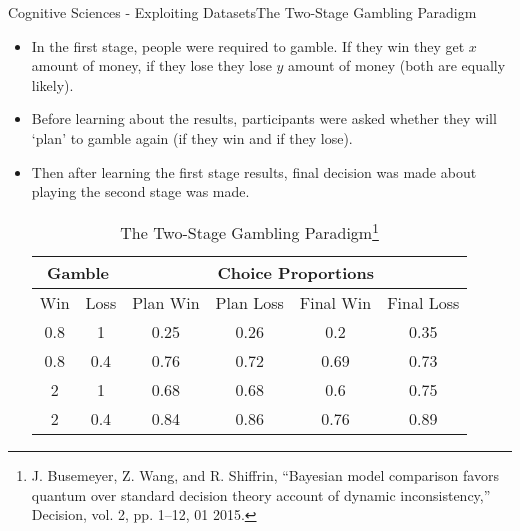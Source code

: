 \documentclass[aspectratio=169, handout]{beamer}
\theoremstyle{example}
\begin{document}
\begin{frame}{Cognitive Sciences - Exploiting Datasets}{The Two-Stage Gambling Paradigm}
  \begin{itemize}
  \pause\item {
    In the first stage, people were required to gamble. If they win they get $x$ amount of money, if they lose they lose $y$ amount of money (both are equally likely).
  }
    \pause\item {
     Before learning about the results, participants were asked whether they will `plan' to gamble again (if they win and if they lose).
  }
  \pause\item {
    Then after learning the first stage results, final decision was made about playing the second stage was made.
  }
  \pause\begin{table}[H]
\centering
\begin{tabular}{cccccc}
\hline
\multicolumn{2}{c}{Gamble} & \multicolumn{4}{c}{Choice Proportions} \\ \hline
Win & Loss & Plan Win & Plan Loss & Final Win & Final Loss \\ \hline
0.8 & 1 & 0.25 & 0.26 & 0.2 & 0.35 \\
0.8 & 0.4 & 0.76 & 0.72 & 0.69 & 0.73 \\
\multicolumn{1}{c}{2} & \multicolumn{1}{c}{1} & \multicolumn{1}{c}{0.68} & \multicolumn{1}{c}{0.68} & \multicolumn{1}{c}{0.6} & \multicolumn{1}{c}{0.75} \\
2 & 0.4 & 0.84 & 0.86 & 0.76 & 0.89\\\hline
\end{tabular}
\caption{The Two-Stage Gambling Paradigm\footnote{\tiny J. Busemeyer, Z. Wang, and R. Shiffrin, “Bayesian model comparison favors quantum over standard
decision theory account of dynamic inconsistency,” Decision, vol. 2, pp. 1–12, 01 2015.}}
\label{tab:ttsgp}
\end{table}
  \end{itemize}
\end{frame}
\end{document}
